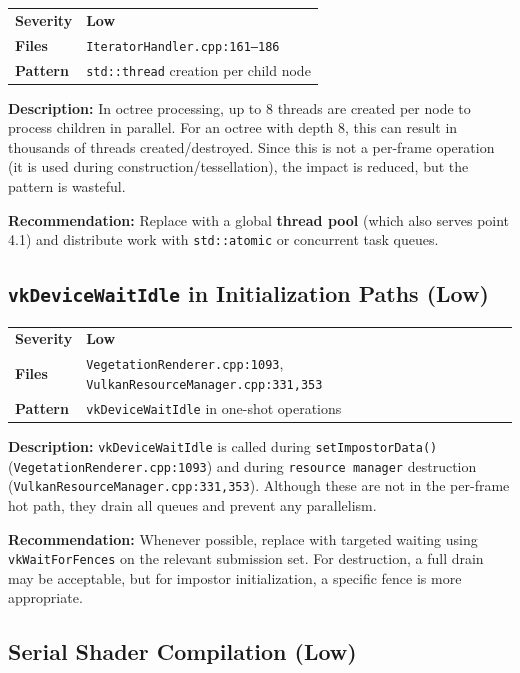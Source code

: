 \documentclass[a4paper,10pt]{article}
\newcommand{\severity}[1]{%
  \ifstrequal{#1}{Critical}{\textcolor{high}{\textbf{#1}}}{%
  \ifstrequal{#1}{High}{\textcolor{high}{\textbf{#1}}}{%
  \ifstrequal{#1}{Medium}{\textcolor{medium}{\textbf{#1}}}{%
  \ifstrequal{#1}{Low}{\textcolor{low}{\textbf{#1}}}{#1}}}}}
\begin{document}
\begin{tabular}{ll}
    \textbf{Severity} & \severity{Low} \\
    \textbf{Files}     & \texttt{IteratorHandler.cpp:161--186} \\
    \textbf{Pattern}   & \texttt{std::thread} creation per child node
\end{tabular}

\vspace{0.5em}
\noindent
\textbf{Description:} In octree processing, up to 8 threads are created per node
to process children in parallel. For an octree with depth 8, this can result in
thousands of threads created/destroyed. Since this is not a per-frame operation
(it is used during construction/tessellation), the impact is reduced, but the
pattern is wasteful.

\noindent\textbf{Recommendation:} Replace with a global \textbf{thread pool}
(which also serves point 4.1) and distribute work with
\texttt{std::atomic} or concurrent task queues.

\subsection{\texttt{vkDeviceWaitIdle} in Initialization Paths (Low)}

\begin{tabular}{ll}
    \textbf{Severity} & \severity{Low} \\
    \textbf{Files}     & \texttt{VegetationRenderer.cpp:1093},
                          \texttt{VulkanResourceManager.cpp:331,353} \\
    \textbf{Pattern}   & \texttt{vkDeviceWaitIdle} in one-shot operations
\end{tabular}

\vspace{0.5em}
\noindent
\textbf{Description:} \texttt{vkDeviceWaitIdle} is called during \texttt{setImpostorData()}
(\texttt{VegetationRenderer.cpp:1093}) and during \texttt{resource manager}
destruction (\texttt{VulkanResourceManager.cpp:331,353}). Although these are
not in the per-frame hot path, they drain all queues and prevent any
parallelism.

\noindent\textbf{Recommendation:} Whenever possible, replace with targeted
waiting using \texttt{vkWaitForFences} on the relevant submission set. For
destruction, a full drain may be acceptable, but for impostor initialization,
a specific fence is more appropriate.

\subsection{Serial Shader Compilation (Low)}
\end{document}
